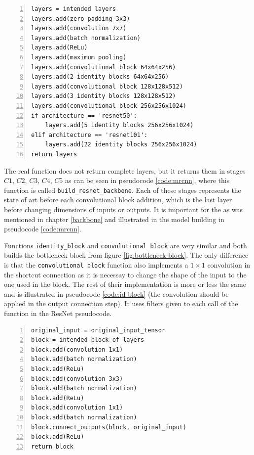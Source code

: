 {\scriptsize
\begin{lstlisting}[style=python, caption={Building the ResNet backbone 
architecture}, captionpos=b, label=code:resnet, deletekeywords={from, max},
backgroundcolor = \color{light-gray}, numbers=left, breaklines=true]
layers = intended layers
layers.add(zero padding 3x3)
layers.add(convolution 7x7)
layers.add(batch normalization)
layers.add(ReLu)
layers.add(maximum pooling)
layers.add(convolutional block 64x64x256)
layers.add(2 identity blocks 64x64x256)
layers.add(convolutional block 128x128x512)
layers.add(3 identity blocks 128x128x512)
layers.add(convolutional block 256x256x1024)
if architecture == 'resnet50':
    layers.add(5 identity blocks 256x256x1024)
elif architecture == 'resnet101':
    layers.add(22 identity blocks 256x256x1024)
return layers
\end{lstlisting}}

The real function does not return complete layers, but it returns them in stages 
$C1$, $C2$, $C3$, $C4$, $C5$ as can be seen in pseudocode \ref{code:mrcnn}, 
where this function is called \verb|build_resnet_backbone|. Each of these stages 
represents the state of art before each convolutional block addition, which is 
the last layer before changing dimensions of inputs or outputs. It is important 
for the  as was mentioned in chapter \ref{backbone} and illustrated in 
the model building in pseudocode \ref{code:mrcnn}.

Functions \verb|identity_block| and \verb|convolutional block| are very similar 
and both builds the bottleneck block from figure \ref{fig:bottleneck-block}. The 
only difference is that the \verb|convolutional block| function also implements 
a $1 \times 1$ convolution in the shortcut connection as it is necessay to 
change the shape of the input to the one used in the block. The rest of their 
implementation is more or less the same and is illustrated in pseudocode 
\ref{code:id-block} (the convolution should be applied in the output connection 
step). It uses filters given to each call of the function in the ResNet 
pseudocode.

{\scriptsize
\begin{lstlisting}[style=python, caption={identity\_block}, captionpos=b, 
label=code:id-block, deletekeywords={from, input},
backgroundcolor = \color{light-gray}, numbers=left, breaklines=true]
original_input = original_input_tensor
block = intended block of layers
block.add(convolution 1x1)
block.add(batch normalization)
block.add(ReLu)
block.add(convolution 3x3)
block.add(batch normalization)
block.add(ReLu)
block.add(convolution 1x1)
block.add(batch normalization)
block.connect_outputs(block, original_input)
block.add(ReLu)
return block
\end{lstlisting}}

